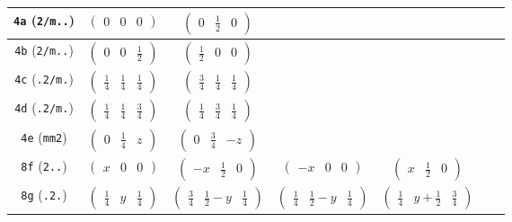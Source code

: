 \documentclass[fleqn,9pt,landscape]{jsarticle}
\begin{document}
\begin{center}
\begin{longtable}{ccccccc}
{\tt 4a} ({\tt 2/m..}) & $ \begin{pmatrix} 0 & 0 & 0 \end{pmatrix} $ & $ \begin{pmatrix} 0 & \frac{1}{2} & 0 \end{pmatrix} $ & $  $ & $  $ & $  $ & $  $ \\ \hline
{\tt 4b} ({\tt 2/m..}) & $ \begin{pmatrix} 0 & 0 & \frac{1}{2} \end{pmatrix} $ & $ \begin{pmatrix} \frac{1}{2} & 0 & 0 \end{pmatrix} $ & $  $ & $  $ & $  $ & $  $ \\ \hline
{\tt 4c} ({\tt .2/m.}) & $ \begin{pmatrix} \frac{1}{4} & \frac{1}{4} & \frac{1}{4} \end{pmatrix} $ & $ \begin{pmatrix} \frac{3}{4} & \frac{1}{4} & \frac{1}{4} \end{pmatrix} $ & $  $ & $  $ & $  $ & $  $ \\ \hline
{\tt 4d} ({\tt .2/m.}) & $ \begin{pmatrix} \frac{1}{4} & \frac{1}{4} & \frac{3}{4} \end{pmatrix} $ & $ \begin{pmatrix} \frac{1}{4} & \frac{3}{4} & \frac{1}{4} \end{pmatrix} $ & $  $ & $  $ & $  $ & $  $ \\ \hline
{\tt 4e} ({\tt mm2}) & $ \begin{pmatrix} 0 & \frac{1}{4} & z \end{pmatrix} $ & $ \begin{pmatrix} 0 & \frac{3}{4} & - z \end{pmatrix} $ & $  $ & $  $ & $  $ & $  $ \\ \hline
{\tt 8f} ({\tt 2..}) & $ \begin{pmatrix} x & 0 & 0 \end{pmatrix} $ & $ \begin{pmatrix} - x & \frac{1}{2} & 0 \end{pmatrix} $ & $ \begin{pmatrix} - x & 0 & 0 \end{pmatrix} $ & $ \begin{pmatrix} x & \frac{1}{2} & 0 \end{pmatrix} $ & $  $ & $  $ \\ \hline
{\tt 8g} ({\tt .2.}) & $ \begin{pmatrix} \frac{1}{4} & y & \frac{1}{4} \end{pmatrix} $ & $ \begin{pmatrix} \frac{3}{4} & \frac{1}{2} - y & \frac{1}{4} \end{pmatrix} $ & $ \begin{pmatrix} \frac{1}{4} & \frac{1}{2} - y & \frac{1}{4} \end{pmatrix} $ & $ \begin{pmatrix} \frac{1}{4} & y + \frac{1}{2} & \frac{3}{4} \end{pmatrix} $ & $  $ & $  $ \\ \hline

\end{longtable}
\end{center}
\end{document}
